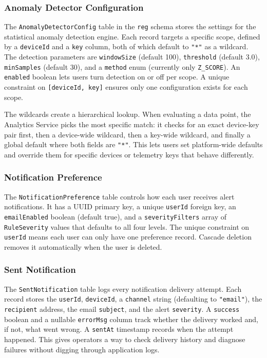 \subsubsection{Anomaly Detector Configuration}
The \texttt{AnomalyDetectorConfig} table in the \texttt{reg} schema stores the settings for the statistical anomaly detection engine. Each record targets a specific scope, defined by a \texttt{deviceId} and a \texttt{key} column, both of which default to \texttt{"*"} as a wildcard. The detection parameters are \texttt{windowSize} (default 100), \texttt{threshold} (default 3.0), \texttt{minSamples} (default 30), and a \texttt{method} enum (currently only \texttt{Z\_SCORE}). An \texttt{enabled} boolean lets users turn detection on or off per scope. A unique constraint on \texttt{[deviceId, key]} ensures only one configuration exists for each scope.

The wildcards create a hierarchical lookup. When evaluating a data point, the Analytics Service picks the most specific match: it checks for an exact device-key pair first, then a device-wide wildcard, then a key-wide wildcard, and finally a global default where both fields are \texttt{"*"}. This lets users set platform-wide defaults and override them for specific devices or telemetry keys that behave differently.

\subsubsection{Notification Preference}
The \texttt{NotificationPreference} table controls how each user receives alert notifications. It has a \gls{UUID} primary key, a unique \texttt{userId} foreign key, an \texttt{emailEnabled} boolean (default true), and a \texttt{severityFilters} array of \texttt{RuleSeverity} values that defaults to all four levels. The unique constraint on \texttt{userId} means each user can only have one preference record. Cascade deletion removes it automatically when the user is deleted.

\subsubsection{Sent Notification}
The \texttt{SentNotification} table logs every notification delivery attempt. Each record stores the \texttt{userId}, \texttt{deviceId}, a \texttt{channel} string (defaulting to \texttt{"email"}), the \texttt{recipient} address, the email \texttt{subject}, and the alert \texttt{severity}. A \texttt{success} boolean and a nullable \texttt{errorMsg} column track whether the delivery worked and, if not, what went wrong. A \texttt{sentAt} timestamp records when the attempt happened. This gives operators a way to check delivery history and diagnose failures without digging through application logs.

